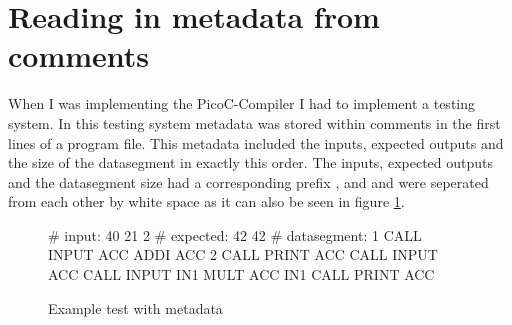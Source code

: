 \documentclass{report}
\begin{document}

\section{Reading in metadata from comments}
\label{sec:reading in metadata from comments}

When I was implementing the PicoC-Compiler I had to implement a testing system. In this testing system metadata was stored within comments in the first lines of a program file. This metadata included the \alert{inputs}, \alert{expected outputs} and the \alert{size of the datasegment} in exactly this order. The inputs, expected outputs and the datasegment size had a corresponding prefix ,  and  and were seperated from each other by white space as it can also be seen in figure \ref{code:example_test}.

\begin{figure}[H]
	\centering
	\begin{dfile}[minted language=bash,minted options={fontsize=\small,autogobble}]
		# input: 40 21 2
		# expected: 42 42
		# datasegment: 1
		CALL INPUT ACC
		ADDI ACC 2
		CALL PRINT ACC
		CALL INPUT ACC
		CALL INPUT IN1
		MULT ACC IN1
		CALL PRINT ACC
	\end{dfile}
	\caption{Example test with metadata}
	\label{code:example_test}
\end{figure}
\end{document}
